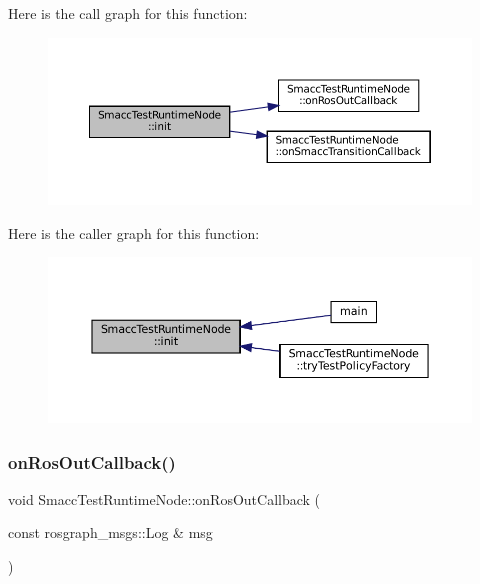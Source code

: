 Here is the call graph for this function\+:
\nopagebreak
\begin{figure}[H]
\begin{center}
\leavevmode
\includegraphics[width=350pt]{classSmaccTestRuntimeNode_a8a75b2f3884af285826c7168753b8886_cgraph}
\end{center}
\end{figure}
Here is the caller graph for this function\+:
\nopagebreak
\begin{figure}[H]
\begin{center}
\leavevmode
\includegraphics[width=350pt]{classSmaccTestRuntimeNode_a8a75b2f3884af285826c7168753b8886_icgraph}
\end{center}
\end{figure}
\mbox{\label{classSmaccTestRuntimeNode_a9d03a2f6a41e75c488f932b7efcb1292}} 
\subsubsection{\texorpdfstring{on\+Ros\+Out\+Callback()}{onRosOutCallback()}}
{\footnotesize\ttfamily void Smacc\+Test\+Runtime\+Node\+::on\+Ros\+Out\+Callback (\begin{DoxyParamCaption}\item[{const rosgraph\+\_\+msgs\+::\+Log \&}]{msg }\end{DoxyParamCaption})\hspace{0.3cm}{\ttfamily [inline]}}



